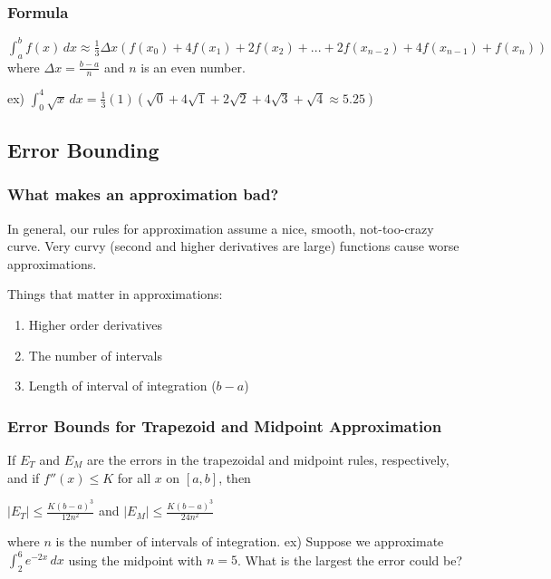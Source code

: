 \documentclass{article}
\begin{document}
\subsubsection{Formula}
$\int_{a}^{b} f(x) \,dx \approx \frac{1}{3} \Delta x(f(x_0) + 4f(x_1) + 2f(x_2) + ... + 2f(x_{n-2}) + 4f(x_{n-1}) + f(x_n))$ where $\Delta x = \frac{b-a}{n}$ and $n$ is an even number.

ex) $\int_{0}^{4} \sqrt{x} \,dx = \frac{1}{3}(1)(\sqrt{0} + 4\sqrt{1} + 2\sqrt{2} + 4\sqrt{3} + \sqrt{4} \approx 5.25)$

\subsection{Error Bounding}

\subsubsection{What makes an approximation bad?}
In general, our rules for approximation assume a nice, smooth, not-too-crazy curve. Very curvy (second and higher derivatives are large) functions cause worse approximations. 

Things that matter in approximations: 
\begin{enumerate}
    \item Higher order derivatives
    \item The number of intervals
    \item Length of interval of integration ($b-a$)
\end{enumerate}

\subsubsection{Error Bounds for Trapezoid and Midpoint Approximation}

If $E_T$ and $E_M$ are the errors in the trapezoidal and midpoint rules, respectively, and if $f''(x) \leq K$ for all $x$ on $[a,b]$, then 

\begin{center}
    $|E_T| \leq \frac{K(b-a)^3}{12n^2}$ and $|E_M| \leq \frac{K(b-a)^3}{24n^2}$
\end{center}

where $n$ is the number of intervals of integration.
\newline
ex) Suppose we approximate $\int_{2}^{6}e^{-2x} \,dx$ using the midpoint with $n=5$. What is the largest the error could be?
\end{document}
